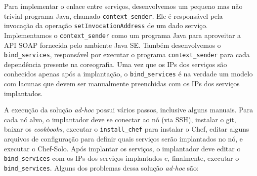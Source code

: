 Para implementar o enlace entre serviços,
desenvolvemos um pequeno mas não trivial programa Java, chamado \texttt{context\_sender}. 
Ele é responsável pela invocação da operação \texttt{setInvocation\allowbreak Address} de um dado serviço.
Implementamos o \texttt{context\_sender} como um programa Java para
aproveitar a API SOAP fornecida pelo ambiente Java SE.
Também desenvolvemos o \script \texttt{bind\_services},
responsável por executar o programa \texttt{context\_sender}
para cada dependência presente na coreografia.
Uma vez que os IPs dos serviços são conhecidos apenas após a implantação,
o \script \texttt{bind\_services} é na verdade um modelo com lacunas
que devem ser manualmente preenchidas com os IPs dos serviços implantados.

A execução da solução \emph{ad-hoc} possui vários passos,
inclusive alguns manuais.
Para cada nó alvo, o implantador deve se conectar ao nó (via SSH),
instalar o git, baixar os \emph{cookbooks}, executar o \script \texttt{install\_chef} 
para instalar o Chef, editar alguns arquivos de configuração para definir
quais serviços serão implantados no nó, e executar o Chef-Solo.
Após implantar os serviços, o implantador deve editar o \script
\texttt{bind\_services} com os IPs dos serviços implantados
e, finalmente, executar o \script \texttt{bind\_services}.
Alguns dos problemas dessa solução \emph{ad-hoc} são:

